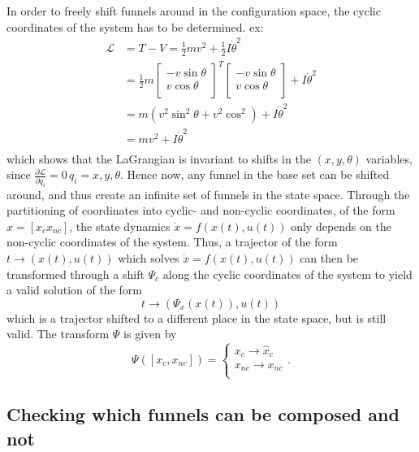 In order to freely shift funnels around in the configuration space, the cyclic
coordinates of the system has to be determined. ex:
\begin{align}
  \mathcal{L} &= T - V = \frac{1}{2} mv^2 + \frac{1}{2}I\dot{\theta}^2 \\ 
              &= \frac{1}{2} 
                m\begin{bmatrix}
                  -v\sin \theta \\ 
                  v \cos \theta \\
                \end{bmatrix}^{T}
  \begin{bmatrix}
    -v\sin \theta \\
    v \cos \theta \\
  \end{bmatrix}
  + I\dot{\theta}^2 \\
              &= m \left(
                v^2 \sin^2 \theta + v^2 \cos^2
                \right)  + I {\dot{\theta}}^2 \\
              &= mv^2 + I {\dot{\theta}}^2 \\
\end{align}
which shows that the LaGrangian is invariant to shifts in the \((x,y,\theta)\)
variables, since \(\frac{\partial\mathcal{L}}{\partial q_i} = 0 \, q_i =
x,y,\theta\). Hence now, any funnel in the base set can be shifted around, and
thus create an infinite set of funnels in the state space. Through the
partitioning of coordinates into cyclic- and non-cyclic coordinates, of the form
\(x = [x_c x_{nc}]\), the state dynamics \(\dot{x} = f(x(t), u(t))\) only
depends on the non-cyclic coordinates of the system. Thus, a trajector of the
form \(t \rightarrow (x(t),u(t))\) which solves \(\dot{x} = f(x(t),u(t))\) can
then be transformed through a shift \(\Psi_c\) along the cyclic coordinates of
the system to yield a valid solution of the form
\[
  t \rightarrow (\Psi_{x}(x(t)), u(t))
\]
which is a trajector shifted to a different place in the state space, but is
still valid. The transform \(\Psi\) is given by
\[
  \Psi([x_c, x_{nc}]) =  
  \begin{cases}
    x_c \rightarrow \hat{x}_{c} \\
    x_{nc} \rightarrow x_{nc} \\
  \end{cases}.
\]

\subsection{Checking which funnels can be composed and not}
\label{sec:composable-funnels}

